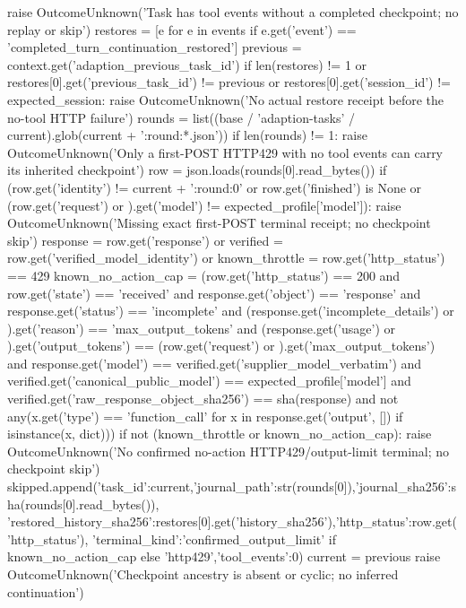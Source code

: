{            raise OutcomeUnknown('Task has tool events without a completed checkpoint; no replay or skip')
        restores = [e for e in events if e.get('event') == 'completed_turn_continuation_restored']
        previous = context.get('adaption_previous_task_id')
        if len(restores) != 1 or restores[0].get('previous_task_id') != previous or restores[0].get('session_id') != expected_session:
            raise OutcomeUnknown('No actual restore receipt before the no-tool HTTP failure')
        rounds = list((base / 'adaption-tasks' / current).glob(current + ':round:*.json'))
        if len(rounds) != 1:
            raise OutcomeUnknown('Only a first-POST HTTP429 with no tool events can carry its inherited checkpoint')
        row = json.loads(rounds[0].read_bytes())
        if (row.get('identity') != current + ':round:0' or row.get('finished') is None
                or (row.get('request') or {}).get('model') != expected_profile['model']):
            raise OutcomeUnknown('Missing exact first-POST terminal receipt; no checkpoint skip')
        response = row.get('response') or {}
        verified = row.get('verified_model_identity') or {}
        known_throttle = row.get('http_status') == 429
        known_no_action_cap = (row.get('http_status') == 200 and row.get('state') == 'received'
            and response.get('object') == 'response' and response.get('status') == 'incomplete'
            and (response.get('incomplete_details') or {}).get('reason') == 'max_output_tokens'
            and (response.get('usage') or {}).get('output_tokens') == (row.get('request') or {}).get('max_output_tokens')
            and response.get('model') == verified.get('supplier_model_verbatim')
            and verified.get('canonical_public_model') == expected_profile['model']
            and verified.get('raw_response_object_sha256') == sha(response)
            and not any(x.get('type') == 'function_call' for x in response.get('output', []) if isinstance(x, dict)))
        if not (known_throttle or known_no_action_cap):
            raise OutcomeUnknown('No confirmed no-action HTTP429/output-limit terminal; no checkpoint skip')
        skipped.append({'task_id':current,'journal_path':str(rounds[0]),'journal_sha256':sha(rounds[0].read_bytes()),
                        'restored_history_sha256':restores[0].get('history_sha256'),'http_status':row.get('http_status'),
                        'terminal_kind':'confirmed_output_limit' if known_no_action_cap else 'http429','tool_events':0})
        current = previous
    raise OutcomeUnknown('Checkpoint ancestry is absent or cyclic; no inferred continuation')

}
